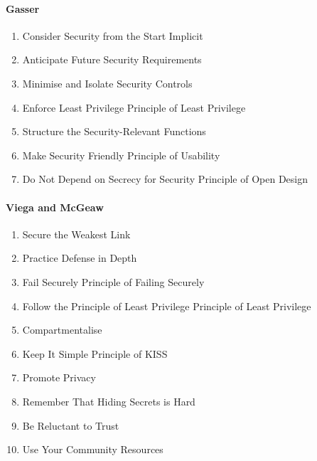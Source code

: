 \paragraph{Gasser}
\begin{enumerate}
    \item Consider Security from the Start \dotfill Implicit
    \item Anticipate Future Security Requirements
    \item Minimise and Isolate Security Controls
    \item Enforce Least Privilege \dotfill Principle of Least Privilege
    \item Structure the Security-Relevant Functions
    \item Make Security Friendly \dotfill Principle of Usability
    \item Do Not Depend on Secrecy for Security \dotfill Principle of Open Design
\end{enumerate}

\paragraph{Viega and McGeaw}
\begin{enumerate}
    \item Secure the Weakest Link
    \item Practice Defense in Depth
    \item Fail Securely \dotfill Principle of Failing Securely
    \item Follow the Principle of Least Privilege \dotfill Principle of Least Privilege
    \item Compartmentalise
    \item Keep It Simple \dotfill Principle of KISS
    \item Promote Privacy
    \item Remember That Hiding Secrets is Hard
    \item Be Reluctant to Trust
    \item Use Your Community Resources
\end{enumerate}

\pagebreak
